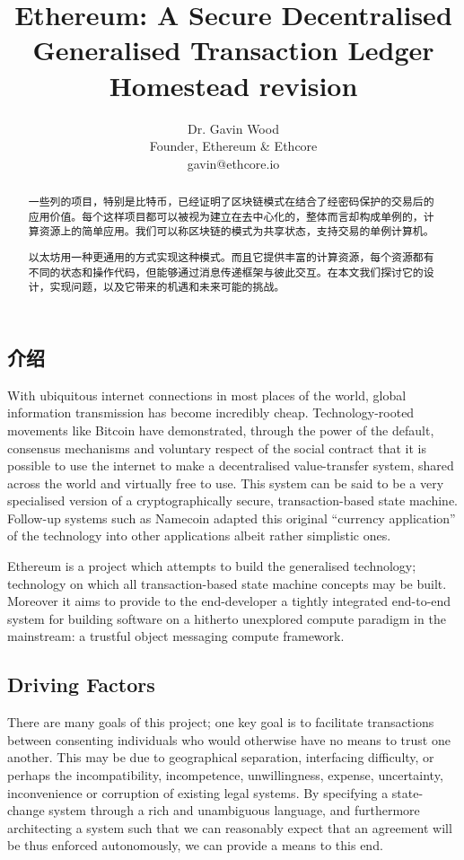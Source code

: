\documentclass[UTF8,nofonts]{ctexart}
\title{Ethereum: A Secure Decentralised Generalised Transaction Ledger \\ {\smaller \textbf{Homestead revision}}}
\author{
    Dr. Gavin Wood\\
    Founder, Ethereum \& Ethcore\\
    gavin@ethcore.io
}
\begin{document}
\pagecolor{lightpink}

\begin{abstract}
一些列的项目，特别是比特币，已经证明了区块链模式在结合了经密码保护的交易后的应用价值。每个这样项目都可以被视为建立在去中心化的，整体而言却构成单例的，计算资源上的简单应用。我们可以称区块链的模式为共享状态，支持交易的单例计算机。

以太坊用一种更通用的方式实现这种模式。而且它提供丰富的计算资源，每个资源都有不同的状态和操作代码，但能够通过消息传递框架与彼此交互。在本文我们探讨它的设计，实现问题，以及它带来的机遇和未来可能的挑战。
\end{abstract}

\setlength{\columnsep}{20pt}
\begin{multicols}{2}

\section{介绍}\label{sec:introduction}

With ubiquitous internet connections in most places of the world, global information transmission has become incredibly cheap. Technology-rooted movements like Bitcoin have demonstrated, through the power of the default, consensus mechanisms and voluntary respect of the social contract that it is possible to use the internet to make a decentralised value-transfer system, shared across the world and virtually free to use. This system can be said to be a very specialised version of a cryptographically secure, transaction-based state machine. Follow-up systems such as Namecoin adapted this original ``currency application'' of the technology into other applications albeit rather simplistic ones.

Ethereum is a project which attempts to build the generalised technology; technology on which all transaction-based state machine concepts may be built. Moreover it aims to provide to the end-developer a tightly integrated end-to-end system for building software on a hitherto unexplored compute paradigm in the mainstream: a trustful object messaging compute framework.

\subsection{Driving Factors} \label{ch:driving}

There are many goals of this project; one key goal is to facilitate transactions between consenting individuals who would otherwise have no means to trust one another. This may be due to geographical separation, interfacing difficulty, or perhaps the incompatibility, incompetence, unwillingness, expense, uncertainty, inconvenience or corruption of existing legal systems. By specifying a state-change system through a rich and unambiguous language, and furthermore architecting a system such that we can reasonably expect that an agreement will be thus enforced autonomously, we can provide a means to this end.


\end{multicols}
\end{document}
